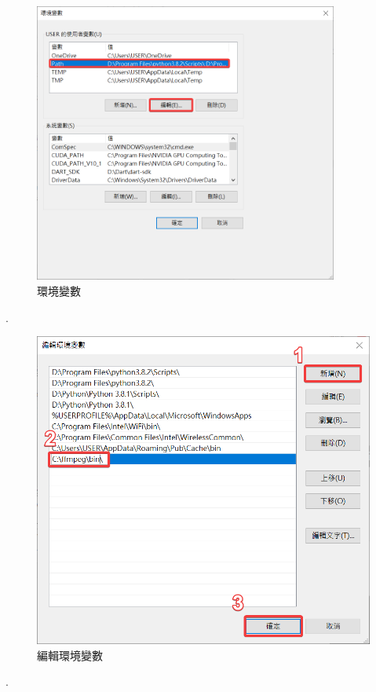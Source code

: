 \documentclass[14pt,a4paper]{report}  %
\begin{document}
\begin{figure}[hbt!]
\begin{center}
\includegraphics[width=10cm]{Q_ffmpeg-3}
\caption{\Large 環境變數}
\label{fig.Q_ffmpeg-3}
\end{center}
\end{figure}
\fontsize{0.001pt}{1pt}\selectfont .\\ %
\newpage
\begin{figure}[hbt!]
\begin{center}
\includegraphics[width=15cm]{Q_ffmpeg-4}
\caption{\Large 編輯環境變數}
\label{fig.Q_ffmpeg-4}
\end{center}
\end{figure}
\fontsize{0.001pt}{1pt}\selectfont .\\ %
\end{document}
